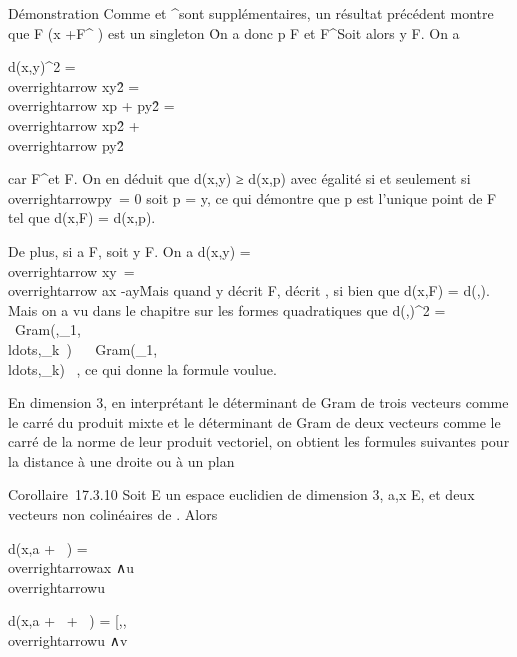 \documentclass[]{article}
\begin{document}
Démonstration Comme \overrightarrowF et
\overrightarrowF^\bot sont supplémentaires,
un résultat précédent montre que F \bigcap\left (x
+\overrightarrow F^\bot\right
) est un singleton \p\. On a donc p \in
F et \overrightarrowxp
\in\overrightarrow F^\bot Soit alors y \in F. On
a

d(x,y)^2
=\\overrightarrow
xy\^2
=\\overrightarrow xp
+\overrightarrow
py\^2
=\\overrightarrow
xp\^2
+\\overrightarrow
py\^2

car \overrightarrowxp
\in\overrightarrow F^\bot et
\overrightarrowpy \in F. On en déduit que d(x,y) ≥
d(x,p) avec égalité si et seulement
si~\\overrightarrowpy\
= 0 soit p = y, ce qui démontre que p est l'unique point de F tel que
d(x,F) = d(x,p).

De plus, si a \in F, soit y \in F. On a d(x,y)
=\\overrightarrow
xy\
=\
-\. Mais
quand y décrit F, \overrightarroway décrit
\overrightarrowF, si bien que d(x,F) =
d(\overrightarrowax,\overrightarrowF).
Mais on a vu dans le chapitre sur les formes quadratiques que
d(\overrightarrow\xi,\overrightarrowF)^2
= \mathrm{det}~
\
Gram(\overrightarrow\xi,\vece_1,\\ldots,\vece_k~)
\over
{}~
\
Gram(\vece_1,\\ldots,\vece_k)~
, ce qui donne la formule voulue.

En dimension 3, en interprétant le déterminant de Gram de trois vecteurs
comme le carré du produit mixte et le déterminant de Gram de deux
vecteurs comme le carré de la norme de leur produit vectoriel, on
obtient les formules suivantes pour la distance à une droite ou à un
plan

Corollaire~17.3.10 Soit E un espace euclidien de dimension 3, a,x \in E,
\overrightarrowu et
\overrightarrowv deux vecteurs non colinéaires de
\overrightarrowE. Alors

d(x,a + ~\overrightarrowu) =
\\overrightarrowax
∧\
\over
\\overrightarrowu\

d(x,a + \mathbb{R}~\overrightarrowu +
\mathbb{R}~\overrightarrowv) = \Big
{[}\overrightarrowax,\overrightarrowu,\overrightarrowv{]}\Big
 \over
\\overrightarrowu
∧\overrightarrow v\
\end{document}
